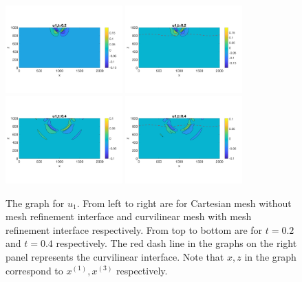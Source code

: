 \begin{figure}[htbp]
	\centering
	\includegraphics[width=0.4\textwidth,trim={0 2.8cm 0 2.8cm}, clip]{u1_t02_cartesian.png}
	\includegraphics[width=0.4\textwidth,trim={0 2.8cm 0 2.8cm}, clip]{u1_t02_curvi_mr.png}\\
	\includegraphics[width=0.4\textwidth,trim={0 2.8cm 0 2.8cm}, clip]{u1_t04_cartesian.png}
	\includegraphics[width=0.4\textwidth,trim={0 2.8cm 0 2.8cm}, clip]{u1_t04_curvi_mr.png}
	\caption{The graph for $u_1$. From left to right are for Cartesian mesh without mesh refinement interface and curvilinear mesh with mesh refinement interface respectively. From top to bottom are for $t = 0.2$ and $t = 0.4$ respectively. The red dash line in the graphs on the right panel represents the curvilinear interface. Note that $x,z$ in the graph correspond to $x^{(1)}, x^{(3)}$ respectively.}\label{u1}
\end{figure}

